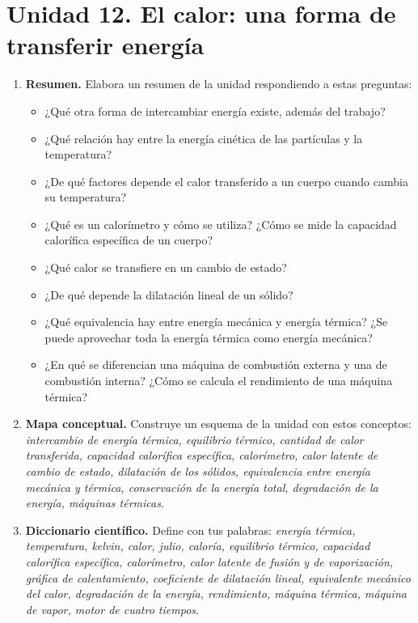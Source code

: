 \section{Unidad 12. El calor: una forma de transferir energía}

\begin{enumerate}[label=\numberballred]
    \item \textbf{Resumen.} Elabora un resumen de la unidad respondiendo a estas preguntas:
    \begin{itemize}
        \item ¿Qué otra forma de intercambiar energía existe, además del trabajo?
        \item ¿Qué relación hay entre la energía cinética de las partículas y la temperatura?
        \item ¿De qué factores depende el calor transferido a un cuerpo cuando cambia su temperatura?
        \item ¿Qué es un calorímetro y cómo se utiliza? ¿Cómo se mide la capacidad calorífica específica de un cuerpo?
        \item ¿Qué calor se transfiere en un cambio de estado?
        \item ¿De qué depende la dilatación lineal de un sólido?
        \item ¿Qué equivalencia hay entre energía mecánica y energía térmica? ¿Se puede aprovechar toda la energía térmica como energía mecánica?
        \item ¿En qué se diferencian una máquina de combustión externa y una de combustión interna? ¿Cómo se calcula el rendimiento de una máquina térmica?
    \end{itemize}
    \item \textbf{Mapa conceptual.} Construye un esquema de la unidad con estos conceptos: \emph{intercambio de energía térmica, equilibrio térmico, cantidad de calor transferida, capacidad calorífica específica, calorímetro, calor latente de cambio de estado, dilatación de los sólidos, equivalencia entre energía mecánica y térmica, conservación de la energía total, degradación de la energía, máquinas térmicas}.
    \item \textbf{Diccionario científico.} Define con tus palabras: \emph{energía térmica, temperatura, kelvin, calor, julio, caloría, equilibrio térmico, capacidad calorífica específica, calorímetro, calor latente de fusión y de vaporización, gráfica de calentamiento, coeficiente de dilatación lineal, equivalente mecánico del calor, degradación de la energía, rendimiento, máquina térmica, máquina de vapor, motor de cuatro tiempos}.
\end{enumerate}

